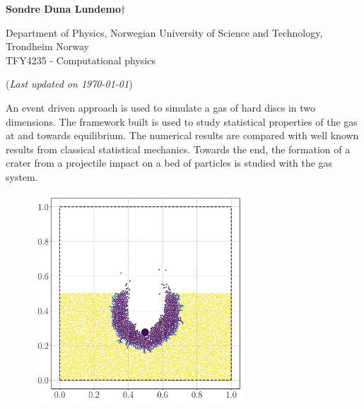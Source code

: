 


	
\begin{titlepage}
	\begin{center}
	\setlength{\parskip}{0em}
	\thispagestyle{titlepage}
	

	\vspace{4mm}
	
	\large{\textbf{Sondre Duna Lundemo}}$\dagger$
	
	\normalsize{Department of Physics, Norwegian University of Science and Technology, Trondheim Norway \\
	TFY4235 - Computational physics
	}

	(\textit{Last updated on \today})
	\end{center}

	\setlength{\parindent}{2em}An event driven approach is used to simulate a gas of hard discs in two dimensions. The framework built is used to study statistical properties of the gas at and towards equilibrium. The numerical results are compared with well known results from classical statistical mechanics. Towards the end, the formation of a crater from a projectile impact on a bed of particles is studied with the gas system. 
	
	\begin{figure}[h]
		\centering
		\includegraphics[width=0.7\textwidth]{../fig/crater_2}
	\end{figure}
	

\end{titlepage}

